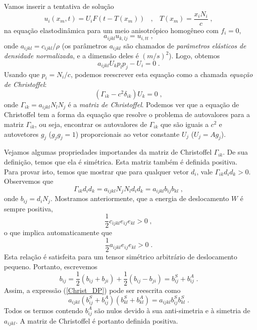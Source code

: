 Vamos inserir a tentativa de solu\c{c}\~ao
\begin{equation}
u_i(x_m,t)=U_iF(t-T(x_m)) \;\;\;,\;\;\; T(x_m)=\frac{x_i N_i}{c}
\;,
\end{equation}
na equa\c{c}\~ao elastodin\^amica para um meio anisotr\'opico
homog\^eneo com $f_i=0$,
\begin{equation}
a_{ijkl}u_{k,lj}=u_{i,tt} \;,
\end{equation}
onde $a_{ijkl}=c_{ijkl}/\rho$ (os par\^ametros $a_{ijkl}$ s\~ao
chamados de {\it par\^ametros el\'asticos de densidade
normalizada}, e a dimens\~ao deles \'e $(m/s)^2$). Logo, obtemos
\begin{equation}
a_{ijkl}U_k p_l p_j - U_i=0 \;.
\end{equation}
Usando que $p_i=N_i/c$, podemos reescrever esta equa\c{c}\~ao como
a chamada {\it equa\c{c}\~ao de Christoffel}:
\begin{equation}
(\Gamma_{ik}-c^2\delta_{ik})U_k=0 \;,
\end{equation}
onde $\Gamma_{ik}=a_{ijkl}N_lN_j$ \'e a {\it matriz de
Christoffel}. Podemos ver que a equa\c{c}\~ao de Christoffel tem a
forma da equa\c{c}\~ao que resolve o problema de autovalores para
a matriz $\Gamma_{ik}$, ou seja, encontrar os autovalores de
$\Gamma_{ik}$ que s\~ao iguais a $c^2$ e autovetores $g_j$ ($g_j
g_j =1$) proporcionais ao vetor constante $U_j$ ($U_j=Ag_j$).

Vejamos algumas propriedades importandes da matriz de Christoffel
$\Gamma_{ik}$. De sua defini\c{c}\~ao, temos que ela \'e
sim\'etrica. Esta matriz tamb\'em \'e definida positiva. Para
provar isto, temos que mostrar que para qualquer vetor $d_i$, vale
$\Gamma_{ik}d_id_k>0$. Observemos que
\begin{equation}
\Gamma_{ik}d_i d_k = a_{ijkl}N_jN_ld_id_k = a_{ijkl}b_{ij}b_{kl}
\;, \label{Christ_DP}
\end{equation}
onde $b_{ij}=d_iN_j$. Mostramos anteriormente, que a energia de
deslocamento $W$ \'e sempre positiva,
\begin{equation}
\frac{1}{2}c_{ijkl}e_{ij}e_{kl}>0 \;,
\end{equation}
o que implica automaticamente que
\begin{equation}
\frac{1}{2}a_{ijkl}e_{ij}e_{kl}>0 \;.
\end{equation}
Esta rela\c{c}\~ao \'e satisfeita para um tensor sim\'etrico
arbitr\'ario de deslocamento pequeno. Portanto, escrevemos
\begin{equation}
b_{ij}=\frac{1}{2}(b_{ij}+b_{ji})+\frac{1}{2}(b_{ij}-b_{ji})=b_{ij}^S+b_{ij}^A
\;.
\end{equation}
Assim, a express\~ao (\ref{Christ_DP}) pode ser reescrita como
\begin{equation}
a_{ijkl}(b_{ij}^S+b_{ij}^A)(b_{kl}^S+b_{kl}^A)=a_{ijkl}
b_{ij}^Sb_{kl}^S\;.
\end{equation}
Todos os termos contendo $b_{ij}^A$ s\~ao nulos devido \`a sua
anti-simetria e \`a simetria de $a_{ijkl}$. A matriz de
Christoffel \'e portanto definida positiva.

